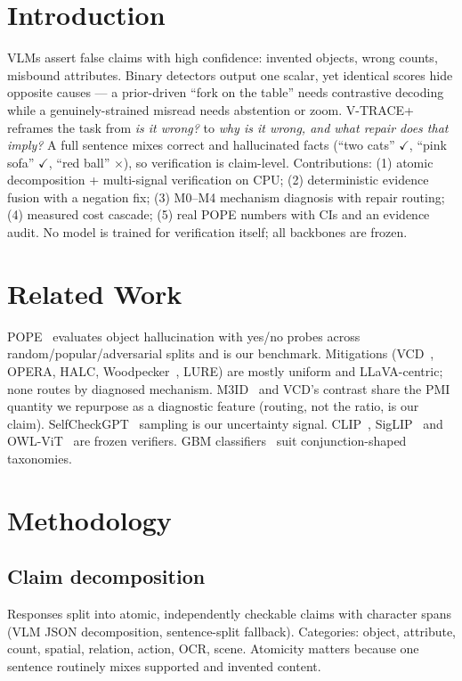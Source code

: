 \documentclass[conference]{IEEEtran}
\begin{document}
\section{Introduction}
VLMs assert false claims with high confidence: invented objects, wrong counts,
misbound attributes. Binary detectors output one scalar, yet identical scores
hide opposite causes --- a prior-driven ``fork on the table'' needs
contrastive decoding while a genuinely-strained misread needs abstention or
zoom. V-TRACE+ reframes the task from \textit{is it wrong?} to \textit{why is
it wrong, and what repair does that imply?} A full sentence mixes correct and
hallucinated facts (``two cats'' $\checkmark$, ``pink sofa'' $\checkmark$,
``red ball'' $\times$), so verification is claim-level. Contributions: (1)
atomic decomposition + multi-signal verification on CPU; (2) deterministic
evidence fusion with a negation fix; (3) M0--M4 mechanism diagnosis with repair
routing; (4) measured cost cascade; (5) real POPE numbers with CIs and an
evidence audit. No model is trained for verification itself; all backbones are
frozen.

\section{Related Work}
POPE~\cite{li2023pope} evaluates object hallucination with yes/no probes across
random/popular/adversarial splits and is our benchmark. Mitigations (VCD~\cite{leng2024vcd},
OPERA, HALC, Woodpecker~\cite{yin2023woodpecker}, LURE) are mostly uniform and
LLaVA-centric; none routes by diagnosed mechanism. M3ID~\cite{favero2024m3id}
and VCD's contrast share the PMI quantity we repurpose as a diagnostic feature
(routing, not the ratio, is our claim). SelfCheckGPT~\cite{manakul2023selfcheckgpt}
sampling is our uncertainty signal. CLIP~\cite{radford2021clip},
SigLIP~\cite{zhai2023siglip} and OWL-ViT~\cite{minderer2022owlvit} are frozen
verifiers. GBM classifiers~\cite{friedman2001gbm} suit conjunction-shaped
taxonomies.

\section{Methodology}
\subsection{Claim decomposition}
Responses split into atomic, independently checkable claims with character
spans (VLM JSON decomposition, sentence-split fallback). Categories: object,
attribute, count, spatial, relation, action, OCR, scene. Atomicity matters
because one sentence routinely mixes supported and invented content.
\end{document}
